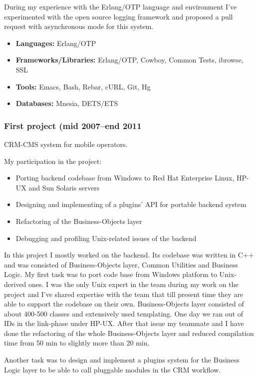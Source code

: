 During my experience with the Erlang/OTP language and environment I've
experimented with the open source logging framework and proposed a
pull request with asynchronous mode for this system.

\begin{itemize}[noitemsep, nosep]
  \item \textbf{Languages:} Erlang/OTP
  \item \textbf{Frameworks/Libraries:} Erlang/OTP, Cowboy, Common
Tests, ibrowse, SSL
  \item \textbf{Tools:} Emacs, Bash, Rebar, cURL, Git, Hg
  \item \textbf{Databases:} Mnesia, DETS/ETS
\end{itemize}

\subsubsection*{First project (mid 2007--end 2011}

CRM-CMS system for mobile operators.

My participation in the project:
\begin{itemize}[noitemsep, nosep]
  \item Porting backend codebase from Windows to Red Hat Enterprise
Linux, HP-UX and Sun Solaris servers
  \item Designing and implementing of a plugins' API for portable
backend system
  \item Refactoring of the Business-Objects layer
  \item Debugging and profiling Unix-related issues of the backend
\end{itemize}

In this project I mostly worked on the backend. Its codebase was
written in C++ and was consisted of Business-Objects layer, Common
Utilities and Business Logic. My first task was to port code base from
Windows platform to Unix-derived ones. I was the only Unix expert in
the team during my work on the project and I've shared expertise with
the team that till present time they are able to support the codebase
on their own. Business-Objects layer consisted of about 400-500
classes and extensively used templating. One day we ran out of IDs in
the link-phase under HP-UX. After that issue my teammate and I have
done the refactoring of the whole Business-Objects layer and reduced
compilation time from 50 min to slightly more than 20 min.

Another task was to design and implement a plugins system for the
Business Logic layer to be able to call pluggable modules in the CRM
workflow.

